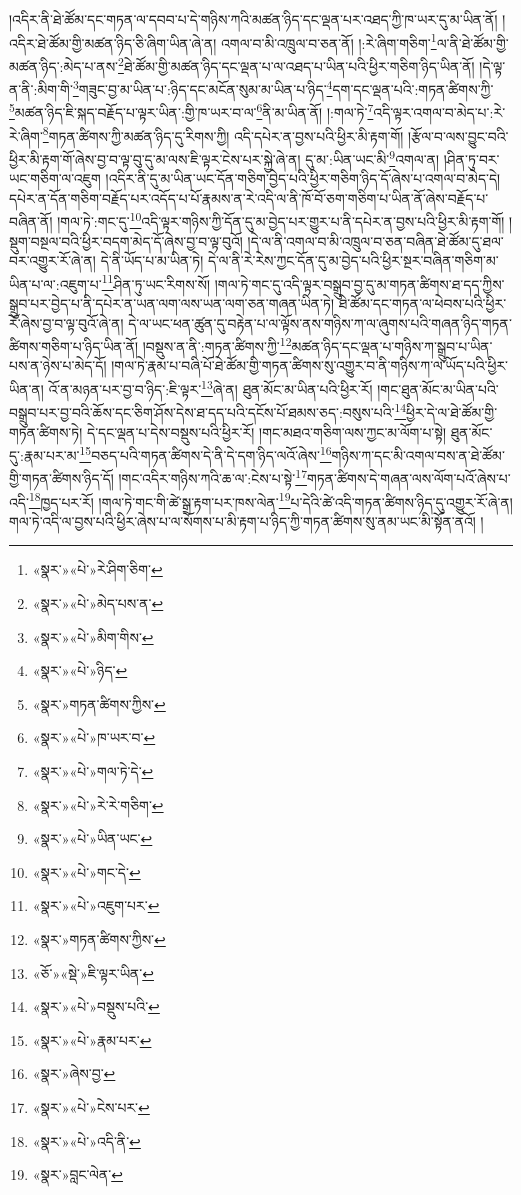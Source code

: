 །འདིར་ནི་ཐེ་ཚོམ་དང་གཏན་ལ་དབབ་པ་དེ་གཉིས་ཀའི་མཚན་ཉིད་དང་ལྡན་པར་འཐད་ཀྱི་ཁ་ཡར་དུ་མ་ཡིན་ནོ། །འདིར་ཐེ་ཚོམ་གྱི་མཚན་ཉིད་ཅི་ཞིག་ཡིན་ཞེ་ན། འགལ་བ་མི་འཁྲུལ་བ་ཅན་ནོ། །:རེ་ཞིག་གཅིག་\footnote{«སྣར་»«པེ་»རེ་ཤིག་ཅིག་}ལ་ནི་ཐེ་ཚོམ་གྱི་མཚན་ཉིད་:མེད་པ་ནས་\footnote{«སྣར་»«པེ་»མེད་པས་ན་}ཐེ་ཚོམ་གྱི་མཚན་ཉིད་དང་ལྡན་པ་ལ་འཐད་པ་ཡིན་པའི་ཕྱིར་གཅིག་ཉིད་ཡིན་ནོ། །དེ་ལྟ་ན་ནི་:མིག་གི་\footnote{«སྣར་»«པེ་»མིག་གིས་}གཟུང་བྱ་མ་ཡིན་པ་:ཉིད་དང་མངོན་སུམ་མ་ཡིན་པ་ཉིད་\footnote{«སྣར་»«པེ་»ཉིད་}དག་དང་ལྡན་པའི་:གཏན་ཚིགས་ཀྱི་\footnote{«སྣར་»གཏན་ཚིགས་ཀྱིས་}མཚན་ཉིད་ཇི་སྐད་བརྗོད་པ་ལྟར་ཡིན་:གྱི་ཁ་ཡར་བ་ལ་\footnote{«སྣར་»«པེ་»ཁ་ཡར་བ་}ནི་མ་ཡིན་ནོ། །:གལ་ཏེ་\footnote{«སྣར་»«པེ་»གལ་ཏེ་དེ་}འདི་ལྟར་འགལ་བ་མེད་པ་:རེ་རེ་ཞིག་\footnote{«སྣར་»«པེ་»རེ་རེ་གཅིག་}གཏན་ཚིགས་ཀྱི་མཚན་ཉིད་དུ་རིགས་ཀྱི། འདི་དཔེར་ན་བྱས་པའི་ཕྱིར་མི་རྟག་གོ། །རྩོལ་བ་ལས་བྱུང་བའི་ཕྱིར་མི་རྟག་གོ་ཞེས་བྱ་བ་ལྟ་བུ་དུ་མ་ལས་ཇི་ལྟར་ངེས་པར་སྐྱེ་ཞེ་ན། དུ་མ་:ཡིན་ཡང་མི་\footnote{«སྣར་»«པེ་»ཡིན་ཡང་}འགལ་ན། །ཤིན་ཏུ་བར་ཡང་གཅིག་ལ་འཇུག །འདིར་ནི་དུ་མ་ཡིན་ཡང་དོན་གཅིག་བྱེད་པའི་ཕྱིར་གཅིག་ཉིད་དོ་ཞེས་པ་འགལ་བ་མེད་དེ། དཔེར་ན་དོན་གཅིག་བརྗོད་པར་འདོད་པ་པོ་རྣམས་ན་རེ་འདི་ལ་ནི་ཁོ་བོ་ཅག་གཅིག་པ་ཡིན་ནོ་ཞེས་བརྗོད་པ་བཞིན་ནོ། །གལ་ཏེ་:གང་དུ་\footnote{«སྣར་»«པེ་»གང་དེ་}འདི་ལྟར་གཉིས་ཀྱི་དོན་དུ་མ་བྱེད་པར་གྱུར་པ་ནི་དཔེར་ན་བྱས་པའི་ཕྱིར་མི་རྟག་གོ། །སྡུག་བསྔལ་བའི་ཕྱིར་བདག་མེད་དོ་ཞེས་བྱ་བ་ལྟ་བུའོ། །དེ་ལ་ནི་འགལ་བ་མི་འཁྲུལ་བ་ཅན་བཞིན་ཐེ་ཚོམ་དུ་ཐལ་བར་འགྱུར་རོ་ཞེ་ན། དེ་ནི་ཡོད་པ་མ་ཡིན་ཏེ། དེ་ལ་ནི་རེ་རེས་ཀྱང་དོན་དུ་མ་བྱེད་པའི་ཕྱིར་སྔར་བཞིན་གཅིག་མ་ཡིན་པ་ལ་:འཇུག་པ་\footnote{«སྣར་»«པེ་»འཇུག་པར་}ཤིན་ཏུ་ཡང་རིགས་སོ། །གལ་ཏེ་གང་དུ་འདི་ལྟར་བསྒྲུབ་བྱ་དུ་མ་གཏན་ཚིགས་ཐ་དད་ཀྱིས་སྒྲུབ་པར་བྱེད་པ་ནི་དཔེར་ན་ཡན་ལག་ལས་ཡན་ལག་ཅན་གཞན་ཡིན་ཏེ། ཐེ་ཚོམ་དང་གཏན་ལ་ཕེབས་པའི་ཕྱིར་རོ་ཞེས་བྱ་བ་ལྟ་བུའོ་ཞེ་ན། དེ་ལ་ཡང་ཕན་ཚུན་དུ་བརྟེན་པ་ལ་ལྟོས་ནས་གཉིས་ཀ་ལ་ཞུགས་པའི་གཞན་ཉིད་གཏན་ཚིགས་གཅིག་པ་ཉིད་ཡིན་ནོ། །བསྡུས་ན་ནི་:གཏན་ཚིགས་ཀྱི་\footnote{«སྣར་»གཏན་ཚིགས་ཀྱིས་}མཚན་ཉིད་དང་ལྡན་པ་གཉིས་ཀ་སྒྲུབ་པ་ཡིན་པས་ན་ཉེས་པ་མེད་དོ། །གལ་ཏེ་རྣམ་པ་བཞི་པོ་ཐེ་ཚོམ་གྱི་གཏན་ཚིགས་སུ་འགྱུར་བ་ནི་གཉིས་ཀ་ལ་ཡོད་པའི་ཕྱིར་ཡིན་ན། འོ་ན་མཉན་པར་བྱ་བ་ཉིད་:ཇི་ལྟར་\footnote{«ཅོ་»«སྡེ་»ཇི་ལྟར་ཡིན་}ཞེ་ན། ཐུན་མོང་མ་ཡིན་པའི་ཕྱིར་རོ། །གང་ཐུན་མོང་མ་ཡིན་པའི་བསྒྲུབ་པར་བྱ་བའི་ཆོས་དང་ཅིག་ཤོས་དེས་ཐ་དད་པའི་དངོས་པོ་ཐམས་ཅད་:བསུས་པའི་\footnote{«སྣར་»«པེ་»བསྡུས་པའི་}ཕྱིར་དེ་ལ་ཐེ་ཚོམ་གྱི་གཏན་ཚིགས་ཏེ། དེ་དང་ལྡན་པ་དེས་བསྡུས་པའི་ཕྱིར་རོ། །གང་མཐའ་གཅིག་ལས་ཀྱང་མ་ལོག་པ་སྟེ། ཐུན་མོང་དུ་:རྣམ་པར་མ་\footnote{«སྣར་»«པེ་»རྣམ་པར་}བཅད་པའི་གཏན་ཚིགས་དེ་ནི་དེ་དག་ཉིད་ལའོ་ཞེས་\footnote{«སྣར་»ཞེས་བྱ་}གཉིས་ཀ་དང་མི་འགལ་བས་ན་ཐེ་ཚོམ་གྱི་གཏན་ཚིགས་ཉིད་དོ། །གང་འདིར་གཉིས་ཀའི་ཆ་ལ་:ངེས་པ་སྟེ་\footnote{«སྣར་»«པེ་»ངེས་པར་}གཏན་ཚིགས་དེ་གཞན་ལས་ལོག་པའོ་ཞེས་པ་འདི་\footnote{«སྣར་»«པེ་»འདི་ནི་}ཁྱད་པར་རོ། །གལ་ཏེ་གང་གི་ཚེ་སྒྲ་རྟག་པར་ཁས་ལེན་\footnote{«སྣར་»བླང་ལེན་}པ་དེའི་ཚེ་འདི་གཏན་ཚིགས་ཉིད་དུ་འགྱུར་རོ་ཞེ་ན། གལ་ཏེ་འདི་ལ་བྱས་པའི་ཕྱིར་ཞེས་པ་ལ་སོགས་པ་མི་རྟག་པ་ཉིད་ཀྱི་གཏན་ཚིགས་སུ་ནམ་ཡང་མི་སྟོན་ནའོ། །
